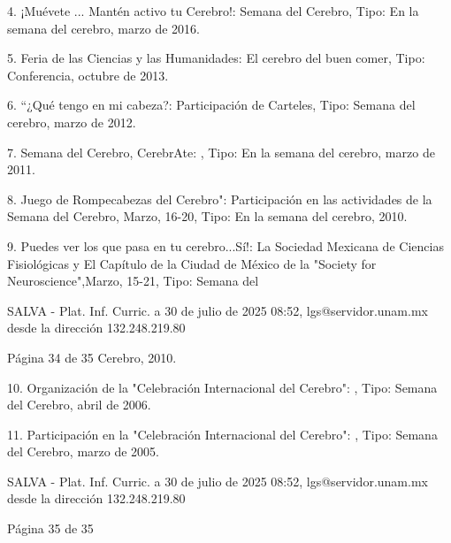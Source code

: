 \documentclass[12pt]{article}
\begin{document}
4. ¡Muévete ... Mantén activo tu Cerebro!: Semana del Cerebro, Tipo: En la semana del cerebro, marzo de 2016.

5. Feria de las Ciencias y las Humanidades: El cerebro del buen comer, Tipo: Conferencia, octubre de 2013.

6. “¿Qué tengo en mi cabeza?: Participación de Carteles, Tipo: Semana del cerebro, marzo de 2012.

7. Semana del Cerebro, CerebrAte: , Tipo: En la semana del cerebro, marzo de 2011.

8. Juego de Rompecabezas del Cerebro": Participación en las actividades de la Semana del Cerebro, Marzo, 16-20, Tipo: En la 
semana del cerebro, 2010.

9. Puedes ver los que pasa en tu cerebro...Sí!: La Sociedad Mexicana de Ciencias Fisiológicas y El Capítulo de la Ciudad de 
México de la "Society for Neuroscience",Marzo, 15-21, Tipo: Semana del

SALVA - Plat. Inf. Curric. a 30 de julio de 2025 08:52, lgs@servidor.unam.mx desde la dirección 132.248.219.80

Página 34 de 35 Cerebro, 2010.

10. Organización de la "Celebración Internacional del Cerebro": , Tipo: Semana del Cerebro, abril de 2006.

11. Participación en la "Celebración Internacional del Cerebro": , Tipo: Semana del Cerebro, marzo de 2005.

SALVA - Plat. Inf. Curric. a 30 de julio de 2025 08:52, lgs@servidor.unam.mx desde la dirección 132.248.219.80

Página 35 de 35
\end{document}
